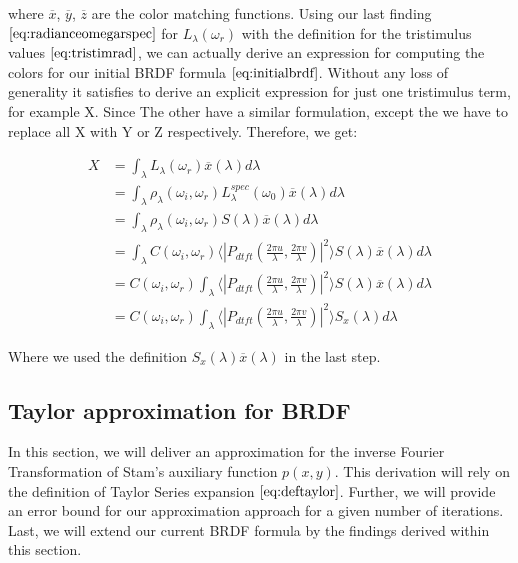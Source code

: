 where $\overline{x}$, $\overline{y}$, $\overline{z}$ are the color matching functions. Using our last finding $\ref{eq:radianceomegarspec}$ for $L_\lambda(\omega_r)$ with the definition for the tristimulus values $\ref{eq:tristimrad}$, we can actually derive an expression for computing the colors for our initial BRDF formula $\ref{eq:initialbrdf}$. 
Without any loss of generality it satisfies to derive an explicit expression for just one tristimulus term, for example X. Since The other have a similar formulation, except the we have to replace all X with Y or Z respectively. Therefore, we get:

\begin{align}
X 
& =\int_{\lambda}L_\lambda(\omega_r)\overline{x}(\lambda)d\lambda \nonumber \\
& =\int_{\lambda}\rho_\lambda(\omega_i,\omega_r)L_\lambda^{spec}(\omega_0) \overline{x}(\lambda)d\lambda \nonumber \\
& =\int_{\lambda}\rho_\lambda(\omega_i,\omega_r) S(\lambda) \overline{x}(\lambda)d\lambda \nonumber \\
& =\int_{\lambda} C(\omega_i,\omega_r) \langle \left|P_{dtft}(\frac{2\pi u}{\lambda}, \frac{2\pi v}{\lambda})\right|^2\rangle S(\lambda) \overline{x}(\lambda)d\lambda \nonumber \\
& = C(\omega_i,\omega_r) \int_{\lambda} \langle \left|P_{dtft}(\frac{2\pi u}{\lambda}, \frac{2\pi v}{\lambda})\right|^2\rangle S(\lambda) \overline{x}(\lambda)d\lambda \nonumber \\
& = C(\omega_i,\omega_r) \int_{\lambda} \langle \left|P_{dtft}(\frac{2\pi u}{\lambda}, \frac{2\pi v}{\lambda})\right|^2\rangle S_x(\lambda)d\lambda
\end{align}

Where we used the definition $S_x(\lambda)\overline{x}(\lambda)$ in the last step.

\subsection{Taylor approximation for BRDF}
\label{sec:taylorapproximation}
In this section, we will deliver an approximation for the inverse Fourier Transformation of Stam's auxiliary function $p(x,y)$. This derivation will rely on the definition of Taylor Series expansion $\ref{eq:deftaylor}$. Further, we will provide an error bound for our approximation approach for a given number of iterations. Last, we will extend our current BRDF formula by the findings derived within this section.

